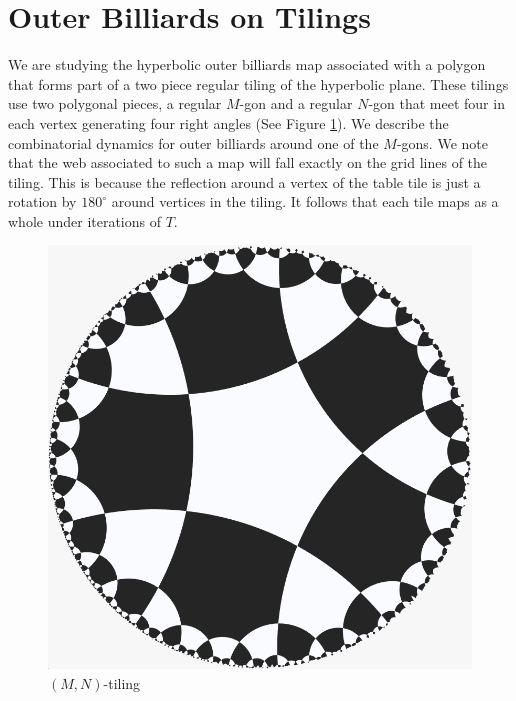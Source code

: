 \documentclass[11pt, oneside]{article}   	%
\begin{document}
\section{Outer Billiards on Tilings}
\indent \indent We are studying the hyperbolic outer billiards map associated with a polygon that forms part of a two piece regular tiling of the hyperbolic plane. These tilings use two polygonal pieces, a regular $M$-gon and a regular $N$-gon that meet four in each vertex generating four right angles (See Figure \ref{mntiling}). We describe the combinatorial dynamics for outer billiards around one of the $M$-gons. We note that the web associated to such a map will fall exactly on the grid lines of the tiling. This is because the reflection around a vertex of the table tile is just a rotation by $180^{\circ}$ around vertices in the tiling. It follows that each tile maps as a whole under iterations of $T$.
\begin{figure}
\centering
\includegraphics[scale=0.3]{Poincaretiling.png}
\caption{$(M,N)$-tiling}
\label{mntiling}
\end{figure}
\end{document}
